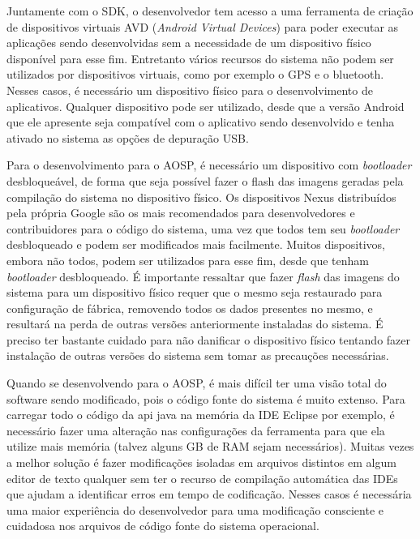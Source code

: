 Juntamente com o SDK, o desenvolvedor tem acesso a uma ferramenta de criação de dispositivos virtuais AVD (\textit{Android Virtual Devices}) para poder executar as aplicações sendo desenvolvidas sem a necessidade de um dispositivo físico disponível para esse fim. Entretanto vários recursos do sistema não podem ser utilizados por dispositivos virtuais, como por exemplo o GPS e o bluetooth. Nesses casos, é necessário um dispositivo físico para o desenvolvimento de aplicativos. Qualquer dispositivo pode ser utilizado, desde que a versão Android que ele apresente seja compatível com o aplicativo sendo desenvolvido e tenha ativado no sistema as opções de depuração USB. 

Para o desenvolvimento para o AOSP, é necessário um dispositivo com \textit{bootloader} desbloqueável, de forma que seja possível fazer o flash das imagens geradas pela compilação do sistema no dispositivo físico. Os dispositivos Nexus distribuídos pela própria Google são os mais recomendados para desenvolvedores e contribuidores para o código do sistema, uma vez que todos tem seu \textit{bootloader} desbloqueado e podem ser modificados mais facilmente. Muitos dispositivos, embora não todos, podem ser utilizados para esse fim, desde que tenham \textit{bootloader} desbloqueado. É importante ressaltar que fazer \textit{flash} das imagens do sistema para um dispositivo físico requer que o mesmo seja restaurado para configuração de fábrica, removendo todos os dados presentes no mesmo, e resultará na perda de outras versões anteriormente instaladas do sistema. É preciso ter bastante cuidado para não danificar o dispositivo físico tentando fazer instalação de outras versões do sistema sem tomar as precauções necessárias.

Quando se desenvolvendo para o AOSP, é mais difícil ter uma visão total do software sendo modificado, pois o código fonte do sistema é muito extenso. Para carregar todo o código da api java na memória da IDE Eclipse por exemplo, é necessário fazer uma alteração nas configurações da ferramenta para que ela utilize mais memória (talvez alguns GB de RAM sejam necessários). Muitas vezes a melhor solução é fazer modificações isoladas em arquivos distintos em algum editor de texto qualquer sem ter o recurso de compilação automática das IDEs que ajudam a identificar erros em tempo de codificação. Nesses casos é necessária uma maior experiência do desenvolvedor para uma modificação consciente e cuidadosa nos arquivos de código fonte do sistema operacional.


